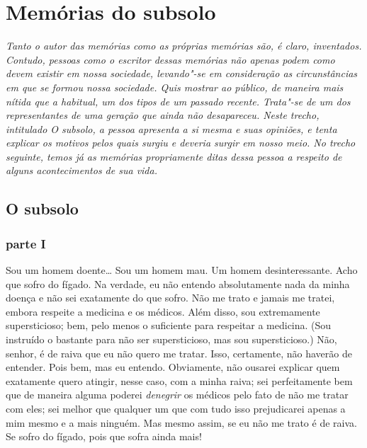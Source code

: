 \part{Memórias do subsolo}

{
	
\mbox{}
\vfill
\thispagestyle{empty}

\small\textit{Tanto o autor das memórias como as próprias \emph{memórias} são, é claro,
inventados. Contudo, pessoas como o escritor dessas memórias não apenas podem
como devem existir em nossa sociedade, levando"-se em consideração as
circunstâncias em que se formou nossa sociedade. Quis mostrar ao público, de
maneira mais nítida que a habitual, um dos tipos de um passado recente.
Trata"-se de um dos representantes de uma geração que ainda não desapareceu.
Neste trecho, intitulado \emph{O subsolo}, a pessoa apresenta a si mesma e suas
opiniões, e tenta explicar os motivos pelos quais surgiu e deveria surgir em
nosso meio. No trecho seguinte, temos já as \emph{memórias} propriamente ditas dessa
pessoa a respeito de alguns acontecimentos de sua vida.}

}

\chapter{O subsolo}

\section{parte I}

Sou um homem doente\ldots{} Sou um homem mau. Um homem desinteressante. Acho
que sofro do fígado. Na verdade, eu não entendo absolutamente nada da
minha doença e não sei exatamente do que sofro. Não me trato e jamais
me tratei, embora respeite a medicina e os médicos. Além disso, sou
extremamente supersticioso; bem, pelo menos o suficiente para respeitar
a medicina. (Sou instruído o bastante para não ser supersticioso, mas
sou supersticioso.) Não, senhor, é de raiva que eu não quero me tratar.
Isso, certamente, não haverão de entender. Pois bem, mas eu entendo.
Obviamente, não ousarei explicar quem exatamente quero atingir, nesse
caso, com a minha raiva; sei perfeitamente bem que de maneira alguma
poderei \textit{denegrir} os médicos pelo fato de não me tratar com eles; sei
melhor que qualquer um que com tudo isso prejudicarei apenas a mim
mesmo e a mais ninguém. Mas mesmo assim, se eu não me trato é de raiva.
Se sofro do fígado, pois que sofra ainda mais!

